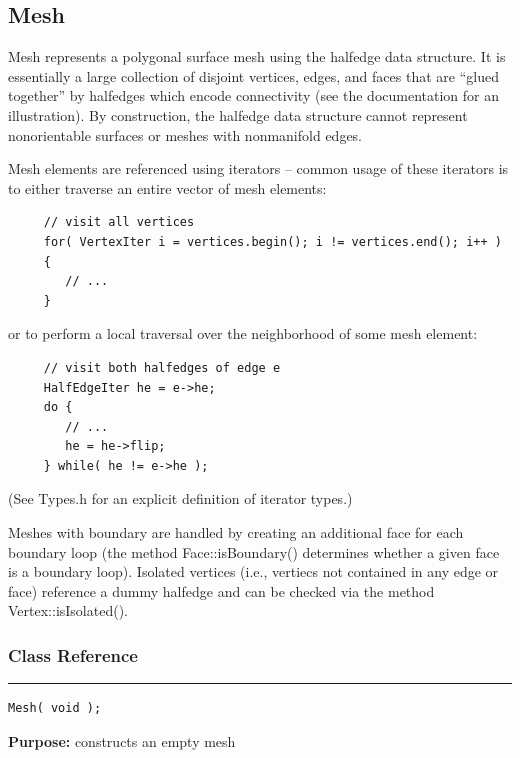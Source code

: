 \documentclass{article}
\begin{document}
\pagebreak\subsection{Mesh}

 

 Mesh represents a polygonal surface mesh using the halfedge data structure. It is essentially a large collection of disjoint vertices, edges, and faces that are ``glued together'' by halfedges which encode connectivity (see the documentation for an illustration).  By construction, the halfedge data structure cannot represent nonorientable surfaces or meshes with nonmanifold edges. 

 Mesh elements are referenced using iterators -- common usage of these iterators is to either traverse an entire vector of mesh elements: 

 \begin{verbatim}
     // visit all vertices
     for( VertexIter i = vertices.begin(); i != vertices.end(); i++ )
     {
        // ...
     }
\end{verbatim}

 or to perform a local traversal over the neighborhood of some mesh element: 

 \begin{verbatim}
     // visit both halfedges of edge e
     HalfEdgeIter he = e->he;
     do {
        // ...
        he = he->flip;
     } while( he != e->he ); 
 \end{verbatim}
\vspace{-\baselineskip} 

 (See Types.h for an explicit definition of iterator types.) 

 Meshes with boundary are handled by creating an additional face for each boundary loop (the method Face::isBoundary() determines whether a given face is a boundary loop).  Isolated vertices (i.e., vertiecs not contained in any edge or face) reference a dummy halfedge and can be checked via the method Vertex::isIsolated(). 



\subsubsection{Class Reference}

\rule{5in}{1pt}
\begin{verbatim}
Mesh( void );
\end{verbatim}
\textbf{Purpose:}
constructs an empty mesh
\end{document}
